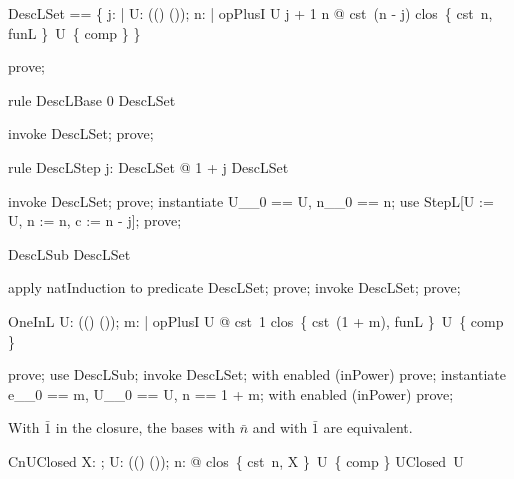 \documentclass{article}
\begin{document}
\begin{zed}
  DescLSet == \{ j: \nat | \forall U: \power ((\nat \fun \nat) \fun (\nat \fun \nat)); n: \nat | opPlusI \in U \land j + 1 \leq n @ cst~(n - j) \in clos~\{ cst~n, funL \}~U~\{ comp \} \}
\end{zed}

\begin{zproof}
prove;
\end{zproof}

\begin{theorem}{rule DescLBase}
  0 \in DescLSet
\end{theorem}

\begin{zproof}
invoke DescLSet;
prove;
\end{zproof}

\begin{theorem}{rule DescLStep}
  \forall j: DescLSet @ 1 + j \in DescLSet
\end{theorem}

\begin{zproof}
invoke DescLSet;
prove;
instantiate U\_\_0 == U, n\_\_0 == n;
use StepL[U := U, n := n, c := n - j];
prove;
\end{zproof}

\begin{theorem}{DescLSub}
  \nat \subseteq DescLSet
\end{theorem}

\begin{zproof}
apply natInduction to predicate \nat \subseteq DescLSet;
prove;
invoke DescLSet;
prove;
\end{zproof}

\begin{theorem}{OneInL}
  \forall U: \power ((\nat \fun \nat) \fun (\nat \fun \nat)); m: \nat | opPlusI \in U @ cst~1 \in clos~\{ cst~(1 + m), funL \}~U~\{ comp \}
\end{theorem}

\begin{zproof}
prove;
use DescLSub;
invoke DescLSet;
with enabled (inPower) prove;
instantiate e\_\_0 == m, U\_\_0 == U, n == 1 + m;
with enabled (inPower) prove;
\end{zproof}


With $\bar 1$ in the closure, the bases with $\bar n$ and with $\bar 1$ are equivalent.

\begin{theorem}{CnUClosed}
  \forall X: \nat \fun \nat; U: \power ((\nat \fun \nat) \fun (\nat \fun \nat)); n: \nat @ clos~\{ cst~n, X \}~U~\{ comp \} \in UClosed~U
\end{theorem}
\end{document}
